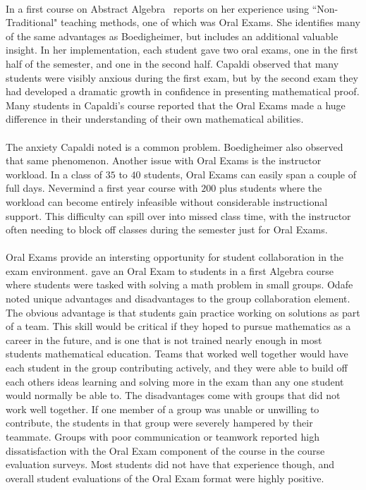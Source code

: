 \documentclass[12pt]{article}
\begin{document}
\paragraph{}
In a first course on Abstract Algebra~\cite{capaldi2014non} reports on her experience using ``Non-Traditional" teaching methods, one of which was Oral Exams. She identifies many of the same advantages as Boedigheimer, but includes an additional valuable insight. In her implementation, each student gave two oral exams, one in the first half of the semester, and one in the second half. Capaldi observed that many students were visibly anxious during the first exam, but by the second exam they had developed a dramatic growth in confidence in presenting mathematical proof. Many students in Capaldi's course reported that the Oral Exams made a huge difference in their understanding of their own mathematical abilities.
\paragraph{}
The anxiety Capaldi noted is a common problem. Boedigheimer also observed that same phenomenon. Another issue with Oral Exams is the instructor workload. In a class of $35$ to $40$ students, Oral Exams can easily span a couple of full days. Nevermind a first year course with $200$ plus students where the workload can become entirely infeasible without considerable instructional support. This difficulty can spill over into missed class time, with the instructor often needing to block off classes during the semester just for Oral Exams. 
\paragraph{}
Oral Exams provide an intersting opportunity for student collaboration in the exam environment. \cite{odafe2006oral} gave an Oral Exam to students in a first Algebra course where students were tasked with solving a math problem in small groups. Odafe noted unique advantages and disadvantages to the group collaboration element. The obvious advantage is that students gain practice working on solutions as part of a team. This skill would be critical if they hoped to pursue mathematics as a career in the future, and is one that is not trained nearly enough in most students mathematical education. Teams that worked well together would have each student in the group contributing actively, and they were able to build off each others ideas learning and solving more in the exam than any one student would normally be able to. The disadvantages come with groups that did not work well together. If one member of a group was unable or unwilling to contribute, the students in that group were severely hampered by their teammate. Groups with poor communication or teamwork reported high dissatisfaction with the Oral Exam component of the course in the course evaluation surveys. Most students did not have that experience though, and overall student evaluations of the Oral Exam format were highly positive.
\end{document}
